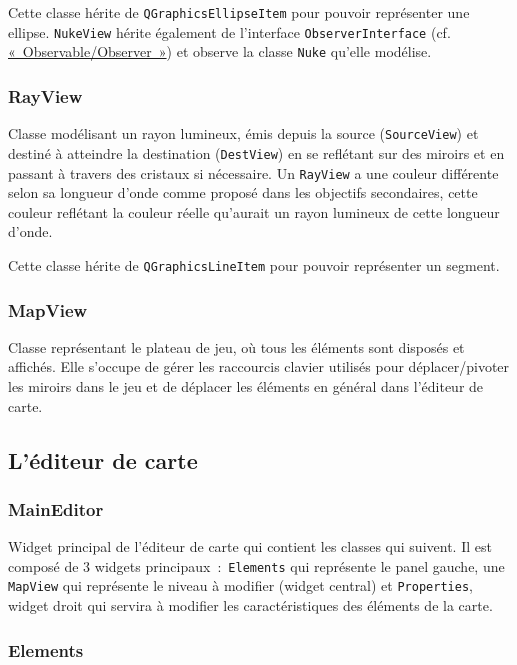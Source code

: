 \documentclass[]{report}
\begin{document}
Cette classe hérite de \texttt{QGraphicsEllipseItem} pour pouvoir représenter une ellipse.
\texttt{NukeView} hérite également de l'interface \texttt{ObserverInterface} (cf. \hyperref[OO]{«~Observable/Observer~»}) et observe
la classe \texttt{Nuke} qu'elle modélise.

\subsubsection{\label{RayView}RayView}

Classe modélisant un rayon lumineux, émis depuis la source (\texttt{SourceView}) et destiné à atteindre la destination 
(\texttt{DestView}) en se reflétant sur des miroirs et en passant à travers des cristaux si nécessaire.
Un \texttt{RayView} a une couleur différente selon sa longueur d’onde comme proposé dans les objectifs secondaires,
cette couleur reflétant la couleur réelle qu’aurait un rayon lumineux de cette longueur d’onde.

Cette classe hérite de \texttt{QGraphicsLineItem} pour pouvoir représenter un segment.

\subsubsection{\label{MapView}MapView}

Classe représentant le plateau de jeu, où tous les éléments sont disposés et affichés.
Elle s’occupe de gérer les raccourcis clavier utilisés pour déplacer/pivoter les miroirs dans le jeu et de déplacer les éléments en général dans l’éditeur de carte.


\subsection{\label{EditeurClasses}L'éditeur de carte}

\subsubsection{\label{MainEditor}MainEditor}

Widget principal de l’éditeur de carte qui contient les classes qui suivent.
Il est composé de 3 widgets principaux~:~\texttt{Elements} qui représente le panel gauche, une \texttt{MapView} qui représente le niveau à modifier (widget central) et \texttt{Properties}, widget droit qui servira à modifier les caractéristiques des éléments de la carte.

\subsubsection{\label{Elements}Elements}
\end{document}
